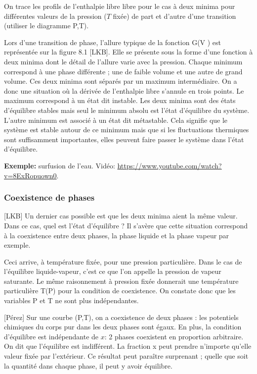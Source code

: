 \documentclass[11pt]{report}
\numberwithin{figure}{section}
\numberwithin{equation}{section}
\numberwithin{table}{section}
\newcommand{\1}{\boldsymbol{1}}
\begin{document}
On trace les profils de l’enthalpie libre libre pour le cas à deux minima pour
différentes valeurs de la pression ($T$ fixée) de part et d'autre d'une transition (utiliser le diagramme P,T).

Lors d’une transition de phase, l’allure typique de la fonction G(V ) est
représentée sur la figure 8.1 [LKB]. Elle se présente sous la forme d’une fonction à
deux minima dont le détail de l’allure varie avec la pression. Chaque minimum
correspond à une phase différente ; une de faible volume et une autre de grand
volume. Ces deux minima sont séparés par un maximum intermédiaire. On a
donc une situation où la dérivée de l’enthalpie libre s’annule en trois points.
Le maximum correspond à un état dit instable. Les deux minima sont des
états d’équilibre stables mais seul le minimum absolu est l’état d’équilibre du
système. L’autre minimum est associé à un état dit métastable. Cela signifie
que le système est stable autour de ce minimum mais que si les fluctuations
thermiques sont suffisamment importantes, elles peuvent faire passer le système
dans l’état d’équilibre.

\textbf{Exemple:} surfusion de l'eau. Vidéo: \url{https://www.youtube.com/watch?v=8ExRopuown0}. 

\subsubsection{Coexistence de phases}

[LKB] Un dernier cas possible est que les deux minima aient la même valeur. Dans
ce cas, quel est l’état d’équilibre ? Il s’avère que cette situation correspond à la coexistence entre deux phases, la phase liquide et la phase vapeur par exemple.

Ceci arrive, à température fixée, pour une pression particulière. Dans le cas de l’équilibre liquide-vapeur, c’est ce que l’on appelle la pression de vapeur saturante.  Le même raisonnement à pression fixée donnerait une température particulière T(P) pour la condition de coexistence. On constate donc que les variables P et T ne sont plus indépendantes.

[Pérez] Sur une courbe (P,T), on a coexistence de deux phases : les potentiels chimiques du corps pur dans les deux phases sont égaux. En plus, la condition d'équilibre est indépendante de $x$: 2 phases coexistent en proportion arbitraire.  On dit que l’équilibre est indifférent. La fraction x peut prendre n’importe qu’elle
valeur fixée par l’extérieur. Ce résultat peut paraître surprenant ; quelle que
soit la quantité dans chaque phase, il peut y avoir équilibre.
\end{document}
